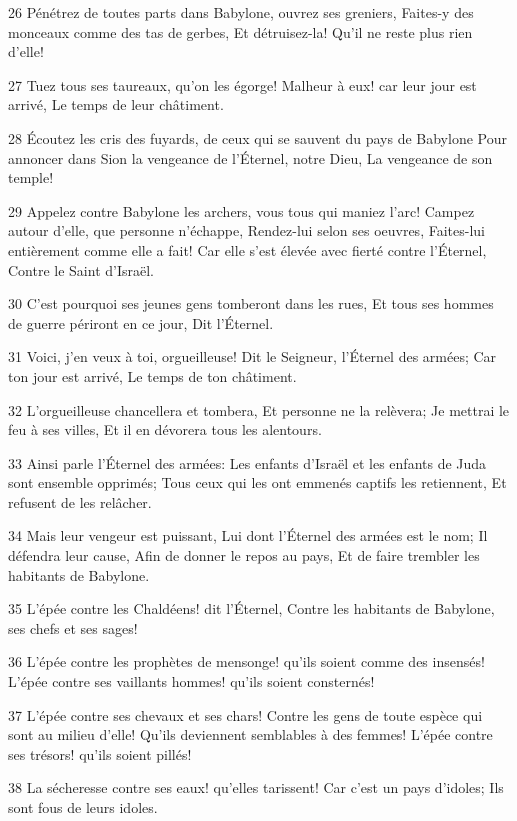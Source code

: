 \par 26 Pénétrez de toutes parts dans Babylone, ouvrez ses greniers, Faites-y des monceaux comme des tas de gerbes, Et détruisez-la! Qu'il ne reste plus rien d'elle!
\par 27 Tuez tous ses taureaux, qu'on les égorge! Malheur à eux! car leur jour est arrivé, Le temps de leur châtiment.
\par 28 Écoutez les cris des fuyards, de ceux qui se sauvent du pays de Babylone Pour annoncer dans Sion la vengeance de l'Éternel, notre Dieu, La vengeance de son temple!
\par 29 Appelez contre Babylone les archers, vous tous qui maniez l'arc! Campez autour d'elle, que personne n'échappe, Rendez-lui selon ses oeuvres, Faites-lui entièrement comme elle a fait! Car elle s'est élevée avec fierté contre l'Éternel, Contre le Saint d'Israël.
\par 30 C'est pourquoi ses jeunes gens tomberont dans les rues, Et tous ses hommes de guerre périront en ce jour, Dit l'Éternel.
\par 31 Voici, j'en veux à toi, orgueilleuse! Dit le Seigneur, l'Éternel des armées; Car ton jour est arrivé, Le temps de ton châtiment.
\par 32 L'orgueilleuse chancellera et tombera, Et personne ne la relèvera; Je mettrai le feu à ses villes, Et il en dévorera tous les alentours.
\par 33 Ainsi parle l'Éternel des armées: Les enfants d'Israël et les enfants de Juda sont ensemble opprimés; Tous ceux qui les ont emmenés captifs les retiennent, Et refusent de les relâcher.
\par 34 Mais leur vengeur est puissant, Lui dont l'Éternel des armées est le nom; Il défendra leur cause, Afin de donner le repos au pays, Et de faire trembler les habitants de Babylone.
\par 35 L'épée contre les Chaldéens! dit l'Éternel, Contre les habitants de Babylone, ses chefs et ses sages!
\par 36 L'épée contre les prophètes de mensonge! qu'ils soient comme des insensés! L'épée contre ses vaillants hommes! qu'ils soient consternés!
\par 37 L'épée contre ses chevaux et ses chars! Contre les gens de toute espèce qui sont au milieu d'elle! Qu'ils deviennent semblables à des femmes! L'épée contre ses trésors! qu'ils soient pillés!
\par 38 La sécheresse contre ses eaux! qu'elles tarissent! Car c'est un pays d'idoles; Ils sont fous de leurs idoles.
